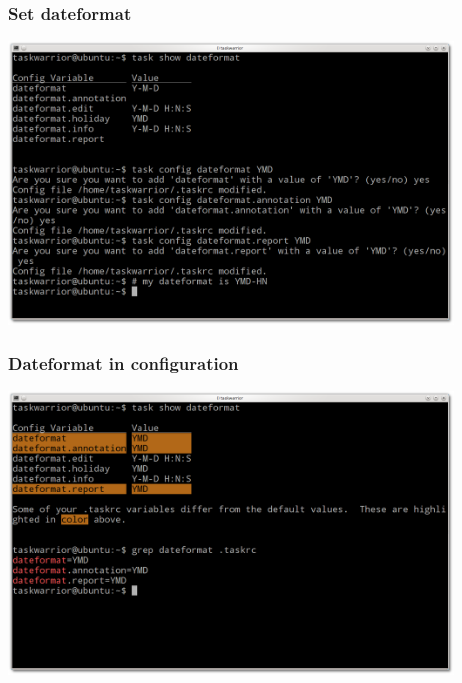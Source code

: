 \documentclass[t,handout]{beamer}
\begin{document}
\begin{frame}[fragile]\frametitle{Set dateformat}
\begin{center} %
\includegraphics[width=11.8cm,height=7.5cm]{dateformat.png}
\end{center}
\end{frame}

\begin{frame}[fragile]\frametitle{Dateformat in configuration}
\begin{center} %
\includegraphics[width=11.8cm,height=7.5cm]{dateformat-config.png}
\end{center}
\end{frame}
\end{document}
